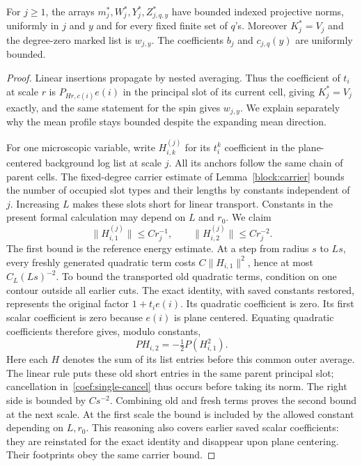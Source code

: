 \begin{lemma}\label{coef:profiles}
For $j\ge1$, the arrays $m_j^*,W_j^*,Y_j^*,Z_{j,q,y}^*$ have bounded indexed
projective norms, uniformly in $j$ and $y$ and for every fixed finite set of
$q$'s.  Moreover $K_j^*=V_j$ and the degree-zero marked list is $w_{j,y}$.
The coefficients $b_j$ and $c_{j,q}(y)$ are uniformly bounded.
\end{lemma}

\begin{proof}
Linear insertions propagate by nested averaging.  Thus the coefficient of
$t_i$ at scale $r$ is $P_{Hr,c(i)}e(i)$ in the principal slot of its current
cell, giving $K_j^*=V_j$ exactly, and the same statement for the spin gives
$w_{j,y}$.  We explain separately why the mean profile stays bounded despite
the expanding mean direction.

For one microscopic variable, write $H_{i,k}^{(j)}$ for its $t_i^k$ coefficient
in the plane-centered background log list at scale $j$.  All its anchors
follow the same chain of parent cells.  The fixed-degree carrier estimate
of Lemma~\ref{block:carrier} bounds the number of occupied slot types
and their lengths by constants independent of $j$.  Increasing $L$ makes
these slots short for linear transport.  Constants in the present formal
calculation may depend on $L$ and $r_0$.  We claim
\begin{equation}\label{coef:single-columns}
 \|H_{i,1}^{(j)}\|\le Cr_j^{-1},\qquad
 \|H_{i,2}^{(j)}\|\le Cr_j^{-2}.
\end{equation}
The first bound is the reference energy estimate.  At a step from radius
$s$ to $Ls$, every freshly generated quadratic term costs $C\|H_{i,1}\|^2$,
hence at most $C_L(Ls)^{-2}$.  To bound the transported old quadratic terms,
condition on one contour outside all earlier cuts.  The exact identity,
with saved constants restored, represents the original factor $1+t_i e(i)$.
Its quadratic coefficient is zero.  Its first scalar coefficient is zero
because $e(i)$ is plane centered.  Equating quadratic coefficients therefore
gives, modulo constants,
\begin{equation}\label{coef:single-cancel}
 P H_{i,2}=-\tfrac12 P(H_{i,1}^2).
\end{equation}
Here each $H$ denotes the sum of its list entries before this common outer
average.  The linear rule puts these old short entries in the same parent
principal slot; cancellation in~\eqref{coef:single-cancel} thus occurs
before taking its norm.  The right side is bounded by $C s^{-2}$.
Combining old and fresh terms proves the second bound at the next scale.
At the first scale the bound is included by the allowed constant depending
on $L,r_0$.  This reasoning also covers earlier saved scalar coefficients:
they are reinstated for the exact identity and disappear upon plane
centering.  Their footprints obey the same carrier bound.


\end{proof}
